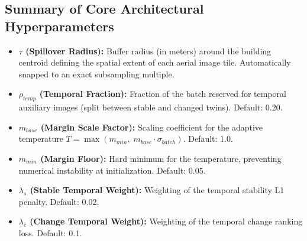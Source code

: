 \documentclass{article}
\begin{document}
\subsection*{Summary of Core Architectural Hyperparameters}
\begin{itemize}
    \item \textbf{$\tau$ (Spillover Radius):} Buffer radius (in meters) around the building centroid defining the spatial extent of each aerial image tile. Automatically snapped to an exact subsampling multiple.
    \item \textbf{$\rho_{temp}$ (Temporal Fraction):} Fraction of the batch reserved for temporal auxiliary images (split between stable and changed twins). Default: 0.20.
    \item \textbf{$m_{base}$ (Margin Scale Factor):} Scaling coefficient for the adaptive temperature $T = \max(m_{min}, \; m_{base} \cdot \sigma_{batch})$. Default: 1.0.
    \item \textbf{$m_{min}$ (Margin Floor):} Hard minimum for the temperature, preventing numerical instability at initialization. Default: 0.05.
    \item \textbf{$\lambda_s$ (Stable Temporal Weight):} Weighting of the temporal stability L1 penalty. Default: 0.02.
    \item \textbf{$\lambda_c$ (Change Temporal Weight):} Weighting of the temporal change ranking loss. Default: 0.1.
\end{itemize}
\end{document}
